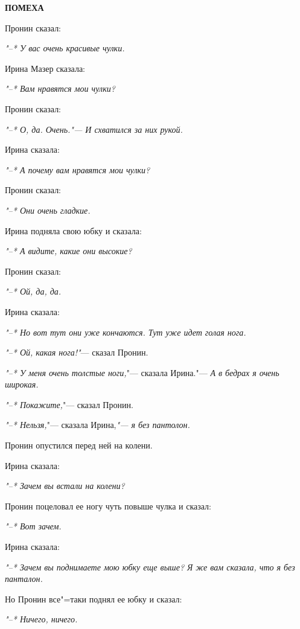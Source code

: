 \begin{center}
    \textbf{ПОМЕХА}
\end{center}

          Пронин сказал:
    
\textsl{"--* У вас очень красивые чулки.}

    Ирина Мазер сказала:
    
\textsl{"--* Вам нравятся мои чулки?}

    Пронин сказал:
    
\textsl{"--* О, да. Очень."---  И схватился за них рукой.}

    Ирина сказала:
    
\textsl{"--* А почему вам нравятся мои чулки?}

    Пронин сказал:
    
\textsl{"--* Они очень гладкие.}
    
    Ирина подняла свою юбку и сказала:
    
\textsl{"--* А видите, какие они высокие?}
    
    Пронин сказал:
    
\textsl{"--* Ой, да, да.}
    
    Ирина сказала:
    
\textsl{"--* Но вот тут они уже кончаются. Тут уже
идет голая нога.}

\textsl{"--* Ой, какая нога!"}---  сказал Пронин.
    
\textsl{"--* У меня очень толстые ноги,}"---   сказала
Ирина."--- \textsl{А в бедрах я очень широкая.}

\textsl{"--* Покажите,}"---  сказал Пронин.
    
\textsl{"--* Нельзя,}"---  сказала Ирина,\textsl{"---  я без пантолон.}
    
    Пронин опустился перед ней на колени.
    
    Ирина сказала:
    
\textsl{"--* Зачем вы встали на колени?}
    
    Пронин  поцеловал ее ногу  чуть  повыше
чулка и сказал:

\textsl{"--* Вот зачем.}
    
    Ирина сказала:
    
\textsl{"--* Зачем вы поднимаете мою юбку  еще 
    выше? Я же вам сказала, что я без панталон.}
    
    Но  Пронин  все"=таки  поднял  ее юбку и
сказал:

\textsl{"--* Ничего, ничего.}
    

